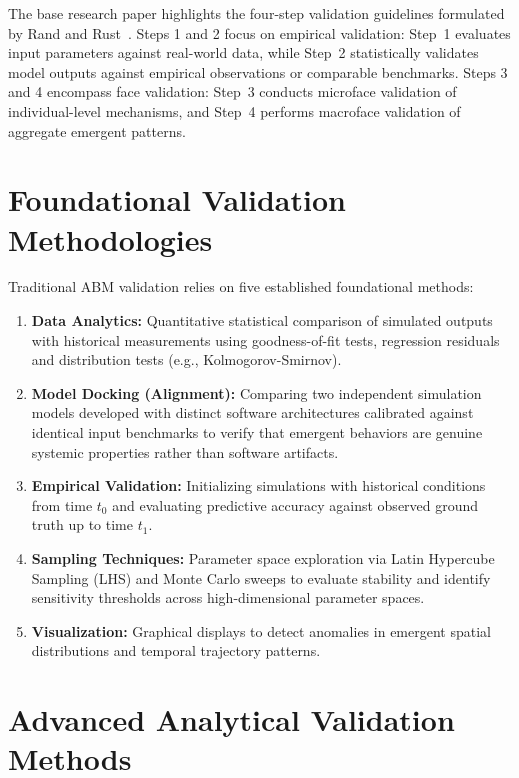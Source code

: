 \documentclass[12pt,a4paper]{report}
\begin{document}
The base research paper highlights the four-step validation guidelines formulated by Rand and Rust~\cite{adornetto2025generative}. Steps 1 and 2 focus on empirical validation: Step~1 evaluates input parameters against real-world data, while Step~2 statistically validates model outputs against empirical observations or comparable benchmarks. Steps 3 and 4 encompass face validation: Step~3 conducts microface validation of individual-level mechanisms, and Step~4 performs macroface validation of aggregate emergent patterns.

\section{Foundational Validation Methodologies}
\label{sec:foundational_val}

Traditional ABM validation relies on five established foundational methods:
\begin{enumerate}[label=\arabic*.]
    \item \textbf{Data Analytics:} Quantitative statistical comparison of simulated outputs with historical measurements using goodness-of-fit tests, regression residuals and distribution tests (e.g., Kolmogorov-Smirnov).
    \item \textbf{Model Docking (Alignment):} Comparing two independent simulation models developed with distinct software architectures calibrated against identical input benchmarks to verify that emergent behaviors are genuine systemic properties rather than software artifacts.
    \item \textbf{Empirical Validation:} Initializing simulations with historical conditions from time $t_0$ and evaluating predictive accuracy against observed ground truth up to time $t_1$.
    \item \textbf{Sampling Techniques:} Parameter space exploration via Latin Hypercube Sampling (LHS) and Monte Carlo sweeps to evaluate stability and identify sensitivity thresholds across high-dimensional parameter spaces.
    \item \textbf{Visualization:} Graphical displays to detect anomalies in emergent spatial distributions and temporal trajectory patterns.
\end{enumerate}

\section{Advanced Analytical Validation Methods}
\label{sec:advanced_val}
\end{document}
